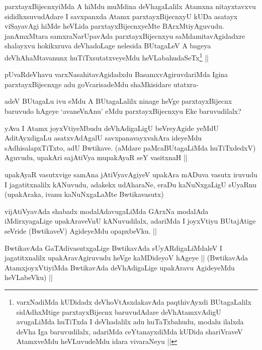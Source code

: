 \begin{artha}
parxtayxBijecnxyiMda A hiMdu muMdina deVhagaLalilx Atamxna nitayxtavxvu sididhxsuvudAdare I savxpanxda Atamx parxtayxBijecnxyU kUDa asatayx viSayavAgi hiMde heVLida parxtayxBijecnxyeMte BArxMtiyAguvudu. janAmxMtara samxraNarUpavAda parxtayxBijecnxyu saMdamitavAgidadxre shalayxvu hokikxruva deVhadoLage nelesida BUtagaLeV A bageya deVhAhaMtavanunx huTiTxsutatxveyeMdu heVLabahudaSeTx\footnote{varxNadiMda kUDidadx deVhoVtAsxdakavAda paqthivAyxdi BUtagaLalilx sidAdhxMtige parxtayxBijecnx baruvudAdare deVhAtamxvAdigU avugaLiMda huTiTxda I deVhadalilx adu huTaTxbahudu, modalu ilalxda deVha Iga baruvudilalx, adariMda ceYtanayxdiMda kUDida shariVraveV AtamxveMdu heVLuvudeMdu idara vivaraNeyu ||} ||
\end{artha}

\begin{artha}
pUvaRdeVhavu varxNasahitavAgidadxdu BasamxvAgiruvdariMda Igina parxtayxBijecnxge adu goVcarisadeMdu shaMkisidare utatxra-
\end{artha}

\begin{artha}
adeV BUtagaLu ivu eMdu A BUtagaLalilx ninage heVge parxtayxBijecnx baruvudo hAgeye `avaneVnAnu' eMdu parxtayxBijecnxyu Eke baruvudilalx?
\end{artha}

\begin{artha}
yAva I Atamx joyxVtiyeMbudu deVhAdigaLigU beVreyAgide yeMdU AditAyxdigaLu asatxvAdAgalU savxpanavayxvahAra ideyeMdu sAdhisalapxTiTxto, adU Bwtikave. (aMdare paMcaBUtagaLiMda huTiTxdedxV) Aguvudu, upakAri sajAtiVya mupakAyaR seY vasitxnaH ||
\end{artha}

\begin{artha}
upakAyaR vasutxvige samAna jAtiVyavAgiyeV upakAra mADuva vasutx iruvudu I jagatitxnalilx kANuvudu, adakekx udAharaNe, eraDu kaNuNxgaLigU sUyaRnu (upakAraka, ivanu kaNuNxgaLaMte Bwtikavasutx)
\end{artha}

\begin{artha}
vijAtiVyavAda shabadx modalAdavugaLiMda GArxNa modalAda iMdirxyagaLige upakAraveVnU kANuvudilalx, adariMda I joyxVtiyu BUtajAtige seVride (BwtikaveV) AgideyeMdu opapxbeVku. ||
\end{artha}

\begin{artha}
BwtikavAda GaTAdivasutxgaLige BwtikavAda sUyARdigaLiMdaleV I jagatitxnalilx upakAravAgiruvudu heVge kaMDideyoV hAgeye || (BwtikavAda AtamxjoyxVtiyiMda BwtikavAda deVhAdigaLige upakAravu AgideyeMdu heVLabeVku) ||
\end{artha}

